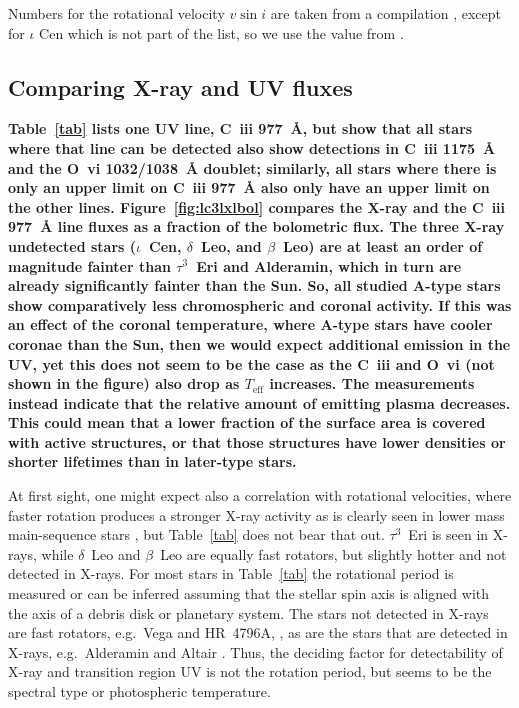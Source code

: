 \documentclass[linenumbers]{aastex631}
\begin{document}
Numbers for the rotational velocity $v \sin i$ are taken from a compilation \citep{2002A&A...393..897R}, except for $\iota$ Cen which is not part of the list, so we use the value from \cite{2002ApJ...579..800S}.



\subsection{Comparing X-ray and UV fluxes}
\textbf{Table~\ref{tab} lists one UV line, C~{\sc iii} 977~\AA{}, but \citet{2002ApJ...579..800S} show that all stars where that line can be detected also show detections in C~{\sc iii} 1175~\AA{} and the O~{\sc vi} 1032/1038~\AA{} doublet; similarly, all stars where there is only an upper limit on C~{\sc iii} 977~\AA{} also only have an upper limit on the other lines. 
Figure~\ref{fig:lc3lxlbol} compares the X-ray and the C~{\sc iii} 977~\AA{} line fluxes as a fraction of the bolometric flux. The three X-ray undetected stars ($\iota$~Cen, $\delta$~Leo, and $\beta$~Leo) are at least an order of magnitude fainter than $\tau^3$~Eri and Alderamin, which in turn are already significantly fainter than the Sun. So, all studied A-type stars show comparatively less chromospheric and coronal activity. 
If this was an effect of the coronal temperature, where A-type stars have cooler coronae than the Sun, then we would expect additional emission in the UV, yet this does not seem to be the case as the C~{\sc iii} and O~{\sc vi} (not shown in the figure) also drop as $T_\mathrm{eff}$ increases. The measurements instead indicate that the relative amount of emitting plasma decreases. This could mean that a lower fraction of the surface area is covered with active structures, or that those structures have lower densities or shorter lifetimes than in later-type stars.}

At first sight, one might expect also a correlation with rotational velocities, where faster rotation produces a stronger X-ray activity as is clearly seen in lower mass main-sequence stars \citep{2011ApJ...743...48W}, but Table~\ref{tab} does not bear that out. $\tau^3$~Eri is seen in X-rays, while $\delta$~Leo and $\beta$~Leo are equally fast rotators, but slightly hotter and not detected in X-rays. 
For most stars in Table~\ref{tab} the rotational period is measured or can be inferred assuming that the stellar spin axis is aligned with the axis of a debris disk or planetary system. The stars not detected in X-rays are fast rotators, e.g.\ Vega \citep[0.68~d,][]{2015A&A...577A..64B} and HR~4796A,  \citep[0.5~d,][]{2014ApJ...786..136D}, as are the stars that are detected in X-rays, e.g.\ Alderamin \citep[0.5~d,][]{2006ApJ...637..494V} and Altair \citep[0.4~d,][]{2006ApJ...636.1087P}. Thus,
the deciding factor for detectability of X-ray and transition region UV is not the rotation period, but seems to be the spectral type or photospheric temperature.
\end{document}

